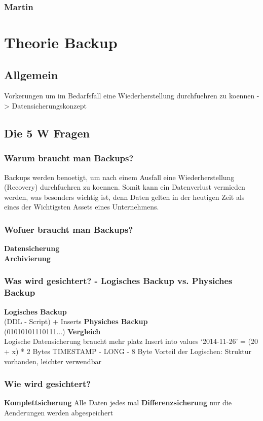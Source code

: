 \documentclass[10pt]{article}
\begin{document}
\subsubsection{Martin}

\section{Theorie Backup}
\subsection{Allgemein} 
Vorkerungen um im Bedarfsfall eine Wiederherstellung durchfuehren zu koennen -> Datensicherungskonzept
\subsection{Die 5 W Fragen} 
\subsubsection{Warum braucht man Backups?}
Backups werden benoetigt, um nach einem Ausfall eine Wiederherstellung (Recovery) durchfuehren zu koennen.
Somit kann ein Datenverlust vermieden werden, was besonders wichtig ist, denn Daten gelten in der heutigen Zeit als eines der Wichtigsten Assets eines Unternehmens.
\subsubsection{Wofuer braucht man Backups?}
\textbf{Datensicherung} \\


\textbf{Archivierung}	\\
\subsubsection{Was wird gesichtert? - Logisches Backup vs. Physiches Backup}
\textbf{Logisches Backup} \\
(DDL - Script) + Inserts
\textbf{Physiches Backup} \\
(01010101110111...) 
\textbf{Vergleich} \\
Logische Datensicherung braucht mehr platz
Insert into values ‘2014-11-26’ = (20 + x) * 2 Bytes
TIMESTAMP - LONG - 8 Byte 
Vorteil der Logischen: Struktur vorhanden, leichter verwendbar

\subsubsection{Wie wird gesichtert?}
\textbf{Komplettsicherung} 
Alle Daten jedes mal 
 \textbf{Differenzsicherung}
 nur die Aenderungen werden abgespeichert
\end{document}
